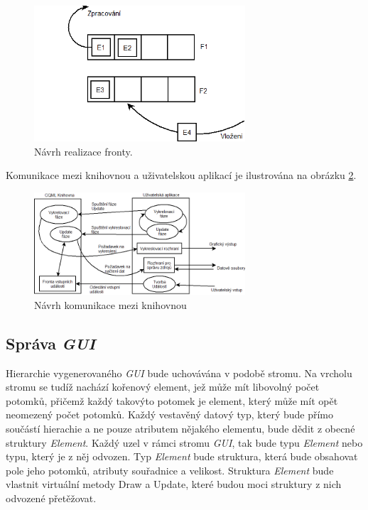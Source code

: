 \documentclass[11pt,twoside,a4paper]{book}
\begin{document}
{{\begin{ttemize}
{{\begin{figure}[!ht]
\begin{center}
  \includegraphics[width=0.7\textwidth]{Diagram5}
\caption{{\label{fig:que1N}}Návrh realizace fronty.}
\end{center}
\end{figure}

Komunikace mezi knihovnou a uživatelskou aplikací je ilustrována na obrázku \ref{fig:lib1N}.\\


\begin{figure}[!ht]
\begin{center}
  \includegraphics[width=0.7\textwidth]{Diagram4}
\caption{{\label{fig:lib1N}} Návrh komunikace mezi knihovnou }
\end{center}
\end{figure}

\subsection {Správa \textit{GUI}}
Hierarchie vygenerovaného \textit{GUI} bude uchovávána v podobě stromu. Na vrcholu stromu se tudíž nachází kořenový element, jež může mít libovolný počet potomků, přičemž každý takovýto potomek je element, který může mít opět neomezený počet potomků. Každý vestavěný datový typ, který bude přímo součástí hierachie a ne pouze atributem nějakého elementu, bude dědit z obecné struktury \textit{Element}. Každý uzel v rámci stromu \textit{GUI}, tak bude typu \textit{Element} nebo typu, který je z něj odvozen. Typ \textit{Element} bude struktura, která bude obsahovat pole jeho potomků, atributy souřadnice a velikost. Struktura \textit{Element} bude vlastnit virtuální metody Draw a Update, které budou moci struktury z nich odvozené přetěžovat.

}}
\end{ttemize}}}
\end{document}
